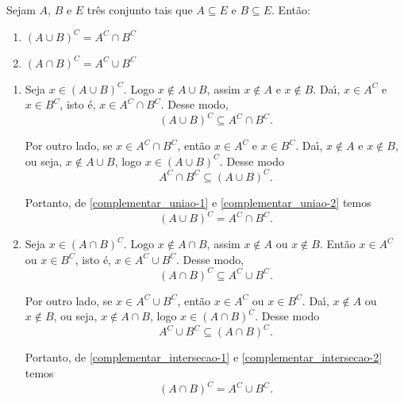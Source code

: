 \begin{proposicao} Sejam $A$, $B$ e $E$ tr{\^e}s conjunto tais que $A\subseteq E$ e $B\subseteq E$. Ent{\~a}o:
\begin{enumerate}
\item $(A\cup B)^C = A^C\cap B^C$
\item $(A\cap B)^C = A^C\cup B^C$
\end{enumerate}
\end{proposicao}
\begin{prova}
	\begin{enumerate}
		\item Seja $x \in (A\cup B)^C$. Logo $x\notin A\cup B$, assim $x\notin A$ e $x\notin B$. Da{\'\i}, $x\in A^C$ e $x\in B^C$, isto {\'e}, $x\in A^C\cap B^C$. Desse modo,
		\begin{equation}\label{complementar_uniao-1}
			(A\cup B)^C \subseteq A^C\cap B^C.
		\end{equation}

		Por outro lado, se $x\in A^C\cap B^C$, ent{\~a}o $x\in A^C$ e $x\in B^C$. Da{\'\i}, $x\notin A$ e $x\notin B$, ou seja, $x\notin A\cup B$, logo $x\in (A\cup B)^C$. Desse modo
		\begin{equation}\label{complementar_uniao-2}
			A^C\cap B^C\subseteq(A\cup B)^C.
		\end{equation}

		Portanto, de \eqref{complementar_uniao-1} e \eqref{complementar_uniao-2} temos
		\[
			(A\cup B)^C = A^C\cap B^C.
		\]

		\item Seja $x \in (A\cap B)^C$. Logo $x\notin A\cap B$, assim $x\notin A$ ou $x\notin B$. Ent\~ao $x\in A^C$ ou $x\in B^C$, isto {\'e}, $x\in A^C\cup B^C$. Desse modo,
		\begin{equation}\label{complementar_intersecao-1}
			(A\cap B)^C \subseteq A^C\cup B^C.
		\end{equation}

		Por outro lado, se $x\in A^C\cup B^C$, ent{\~a}o $x\in A^C$ ou $x\in B^C$. Da{\'\i}, $x\notin A$ ou $x\notin B$, ou seja, $x\notin A\cap B$, logo $x\in (A\cap B)^C$. Desse modo
		\begin{equation}\label{complementar_intersecao-2}
			A^C\cup B^C\subseteq(A\cap B)^C.
		\end{equation}

		Portanto, de \eqref{complementar_intersecao-1} e \eqref{complementar_intersecao-2} temos
		\[
			(A\cap B)^C = A^C\cup B^C.
		\]
	\end{enumerate}
\end{prova}


